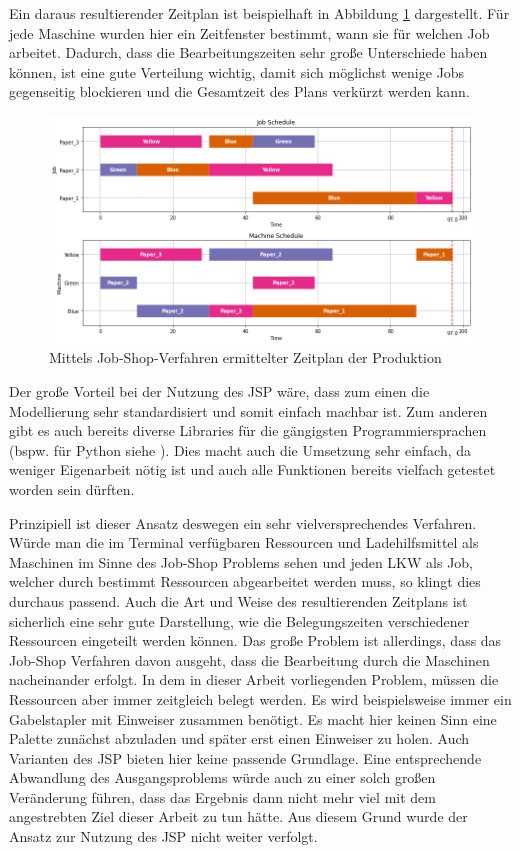 Ein daraus resultierender Zeitplan ist beispielhaft in Abbildung \ref{fig:job_shop_schedule} dargestellt. Für jede Maschine wurden hier ein Zeitfenster bestimmt, wann sie für welchen Job arbeitet. Dadurch, dass die Bearbeitungszeiten sehr große Unterschiede haben können, ist eine gute Verteilung wichtig, damit sich möglichst wenige Jobs gegenseitig blockieren und die Gesamtzeit des Plans verkürzt werden kann.

\begin{figure}[H]
    \centering
    \includegraphics[width=\textwidth]{images/jobshopdiagram_schedule.png}
    \caption{Mittels Job-Shop-Verfahren ermittelter Zeitplan der Produktion \cite{jobshop2}}
    \label{fig:job_shop_schedule}
\end{figure}

Der große Vorteil bei der Nutzung des JSP wäre, dass zum einen die Modellierung sehr standardisiert und somit einfach machbar ist. Zum anderen gibt es auch bereits diverse Libraries für die gängigsten Programmiersprachen (bspw. für Python siehe \cite{jobshop2}). Dies macht auch die Umsetzung sehr einfach, da weniger Eigenarbeit nötig ist und auch alle Funktionen bereits vielfach getestet worden sein dürften.

Prinzipiell ist dieser Ansatz deswegen ein sehr vielversprechendes Verfahren. Würde man die im Terminal verfügbaren Ressourcen und Ladehilfsmittel als Maschinen im Sinne des Job-Shop Problems sehen und jeden LKW als Job, welcher durch bestimmt Ressourcen abgearbeitet werden muss, so klingt dies durchaus passend. Auch die Art und Weise des resultierenden Zeitplans ist sicherlich eine sehr gute Darstellung, wie die Belegungszeiten verschiedener Ressourcen eingeteilt werden können. Das große Problem ist allerdings, dass das Job-Shop Verfahren davon ausgeht, dass die Bearbeitung durch die Maschinen nacheinander erfolgt. In dem in dieser Arbeit vorliegenden Problem, müssen die Ressourcen aber immer zeitgleich belegt werden. Es wird beispielsweise immer ein Gabelstapler mit Einweiser zusammen benötigt. Es macht hier keinen Sinn eine Palette zunächst abzuladen und später erst einen Einweiser zu holen. Auch Varianten des JSP bieten hier keine passende Grundlage. Eine entsprechende Abwandlung des Ausgangsproblems würde auch zu einer solch großen Veränderung führen, dass das Ergebnis dann nicht mehr viel mit dem angestrebten Ziel dieser Arbeit zu tun hätte. Aus diesem Grund wurde der Ansatz zur Nutzung des JSP nicht weiter verfolgt.


